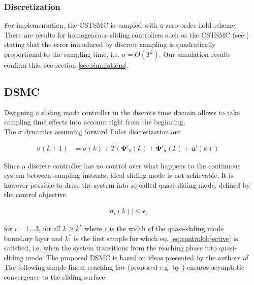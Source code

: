 \documentclass{ifacconf}
\providecommand{\mbf}[1]{\mathbf{#1}}
\newcommand{\idxSample}{{\ensuremath{k}}}
\begin{document}
\subsubsection{Discretization}
For implementation, the CSTSMC is sampled with a zero-order hold scheme. There are results for homogeneous sliding controllers such as the CSTSMC (see \cite{shtessel2014sliding}) stating that the error introduced by discrete sampling is quadratically proportional to the sampling time, i.e. $\sigma = O(T^2)$. Our simulation results confirm this, see section \ref{sec:simulations}.


\subsection{DSMC}
Designing a sliding mode controller in the discrete time domain allows to take sampling time effects into account right from the beginning. \\
The $\sigma$ dynamics assuming forward Euler discretization are

\begin{align}
{{\sigma}}(\idxSample+1)
&=
{{\sigma}}(\idxSample)
+
T(
\mbf{\Phi}'_k(\idxSample) + \mbf{\Phi}'_u(\idxSample) + \mbf{u}'(\idxSample))
\label{eq:sigmadyndiscrete}
\end{align}

Since a discrete controller has no control over what happens to the continuous system between sampling instants, ideal sliding mode is not achievable. It is however possible to drive the system into so-called quasi-sliding mode, defined by the control objective

\begin{align}
|{\sigma}_i(\idxSample)| \leq \mbf{\epsilon}_i
\label{eq:controlobjective}
\end{align}

for $i=1...3$, for all $k \geq k^*$ where $\epsilon$ is the width of the quasi-sliding mode boundary layer and $k^*$ is the first sample for which eq. \ref{eq:controlobjective} is satisfied, i.e. when the system transitions from the reaching phase into quasi-sliding mode.
The proposed DSMC is based on ideas presented by the authors of \cite{monsees2001discrete}
The following simple linear reaching law (proposed e.g. by \cite{Spurgeon1992}) ensures asymptotic convergence to the sliding surface
\end{document}
